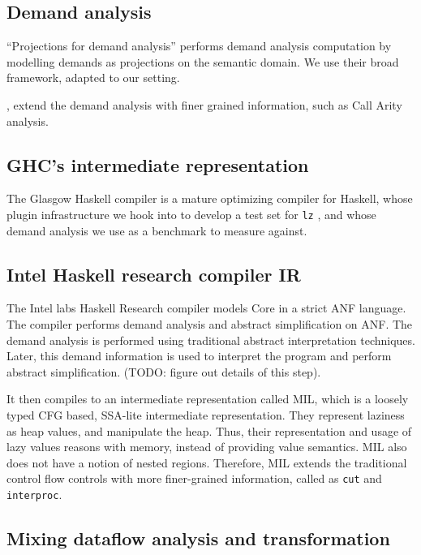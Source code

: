 \documentclass[sigplan,\review anonymous]{acmart}
\newcommand{\lz}{\texttt{lz} }
\begin{document}
\subsection{Demand analysis}
\cite{wadler1987projections} ``Projections for demand analysis'' performs
demand analysis computation by modelling demands as projections on the semantic
domain. We use their broad framework, adapted to our setting. 

\cite{grafcall}, \cite{breitner2014call} extend the demand analysis with
finer grained information, such as Call Arity analysis.

\subsection{GHC's intermediate representation}

The Glasgow Haskell compiler \cite{jones1993glasgow} is a mature optimizing
compiler for Haskell, whose plugin infrastructure we hook into to  develop a test
set for \lz, and whose demand analysis we use as a benchmark to measure against.

\subsection{Intel Haskell research compiler IR}
The Intel labs Haskell Research compiler \cite{liu2013intel} models Core in a
strict ANF language. The compiler performs demand analysis and abstract
simplification on ANF. The demand analysis is performed using traditional
abstract interpretation techniques. Later, this demand information is used
to interpret the program and perform abstract simplification. (TODO: figure out
details of this step).

It then compiles to an intermediate representation called MIL,
which is a loosely typed CFG based, SSA-lite intermediate representation.  They
represent laziness as heap values, and manipulate the heap. Thus, their
representation and usage of lazy values reasons with memory, instead of
providing value semantics.
MIL also does not have a notion of nested regions. Therefore, MIL extends
the traditional control flow controls with more finer-grained information,
called as \texttt{cut} and \texttt{interproc}.


\subsection{Mixing dataflow analysis and transformation}
\end{document}
